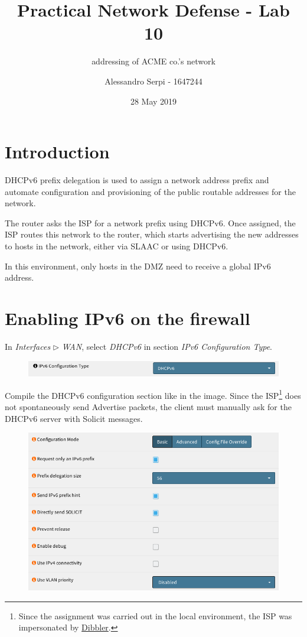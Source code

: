 \documentclass[draft]{homework}
\title{Practical Network Defense - Lab 10}
\subtitle{\ip addressing of ACME co.’s network}
\author{Alessandro Serpi - 1647244}
\date{28 May 2019}
\newcommand{\dhcp}{DHCPv6\xspace}
\newcommand{\ip}{IPv6\xspace}
\newcommand{\isp}{ISP\xspace}
\begin{document}
    \maketitle
    \tableofcontents
    
    
    \pagebreak
    \section{Introduction}
    DHCPv6 prefix delegation is used to assign a network address prefix and automate configuration and provisioning of the public routable addresses for the network.
    
    The router asks the \isp for a network prefix using \dhcp.
    Once assigned, the \isp routes this network to the router, which starts advertising the new addresses to hosts in the network, either via SLAAC or using DHCPv6.
    
    In this environment, only hosts in the DMZ need to receive a global \ip address.
    
    
    \section{Enabling \ip on the firewall}
    In \textit{Interfaces} $\triangleright$ \textit{WAN}, select \textit{\dhcp} in section \textit{\ip Configuration Type}.
    \begin{figure}[H]
        \centering
        \includegraphics[width=\linewidth]{images/wan-ipv6}
        \label{fig:wan-ipv6}
    \end{figure}
    \vspace{-15pt}
    
    Compile the \dhcp configuration section like in the image.
    Since the \isp\footnote{Since the assignment was carried out in the local environment, the \isp was impersonated by \href{https://klub.com.pl/dhcpv6/}{Dibbler}.} does not spontaneously send Advertise packets, the client must manually ask for the \dhcp server with Solicit messages.
    \begin{figure}[H]
        \centering
        \includegraphics[width=\linewidth]{images/wan-dhcp}
        \label{fig:wan-dhcp}
    \end{figure}
    \vspace{-25pt}
    
\end{document}
